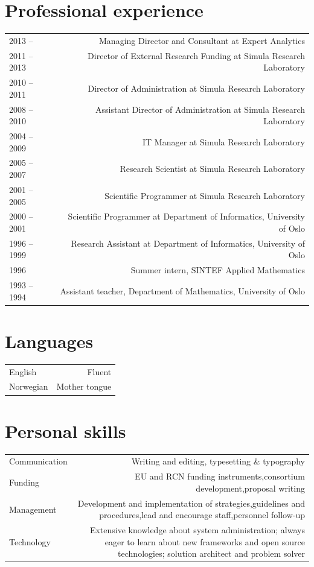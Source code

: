 \documentclass[english,a4paper,11pt]{article}
\begin{document}
\Needspace{\cvneedspaceconst\baselineskip}
\section*{Professional experience}
\begin{longtable}{LR}
2013 --  & Managing Director and Consultant at Expert Analytics\\ 
2011 -- 2013 & Director of External Research Funding at Simula Research Laboratory\\ 
2010 -- 2011 & Director of Administration at Simula Research Laboratory\\ 
2008 -- 2010 & Assistant Director of Administration at Simula Research Laboratory\\ 
2004 -- 2009 & IT Manager at Simula Research Laboratory\\ 
2005 -- 2007 & Research Scientist at Simula Research Laboratory\\ 
2001 -- 2005 & Scientific Programmer at Simula Research Laboratory\\ 
2000 -- 2001 & Scientific Programmer at Department of Informatics, University of Oslo\\ 
1996 -- 1999 & Research Assistant at Department of Informatics, University of Oslo\\ 
1996 & Summer intern, SINTEF Applied Mathematics\\ 
1993 -- 1994 & Assistant teacher, Department of Mathematics, University of Oslo\\ 
\end{longtable}

\Needspace{\cvneedspaceconst\baselineskip}
\section*{Languages}
\begin{longtable}{LR}
English & Fluent\\ 
Norwegian & Mother tongue\\ 
\end{longtable}

\Needspace{\cvneedspaceconst\baselineskip}
\section*{Personal skills}
\begin{longtable}{LR}
Communication & Writing and editing, typesetting \& typography\\ 
Funding & EU and RCN funding instruments,consortium development,proposal writing\\ 
Management & Development and implementation of strategies,guidelines and procedures,lead and encourage staff,personnel follow-up\\ 
Technology & Extensive knowledge about system administration; always eager to learn about new frameworks and open source technologies; solution architect and problem solver\\ 
\end{longtable}
\end{document}
